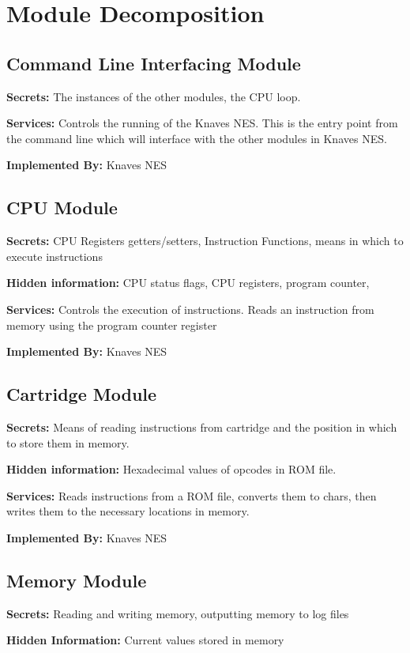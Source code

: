 \documentclass[12pt]{article}
\begin{document}
\section{Module Decomposition}
	\subsection{Command Line Interfacing Module}
		\textbf{Secrets: } The instances of the other modules, the CPU loop.

		\textbf{Services: } Controls the running of the Knaves NES. This is the entry point from the command line which will interface with the other modules in Knaves NES.

		\textbf{Implemented By: } Knaves NES

	\subsection{CPU Module}
		\textbf{Secrets: } CPU Registers getters/setters, Instruction Functions, means in which to execute instructions
		
		\textbf{Hidden information: } CPU status flags, CPU registers, program counter, 
		
		\textbf{Services: } Controls the execution of instructions. Reads an instruction from memory using the program counter register

		\textbf{Implemented By: } Knaves NES

	\subsection{Cartridge Module}
		\textbf{Secrets: } Means of reading instructions from cartridge and the position in which to store them in memory.

		\textbf{Hidden information: } Hexadecimal values of opcodes in ROM file.

		\textbf{Services: } Reads instructions from a ROM file, converts them to chars, then writes them to the necessary locations in memory.

		\textbf{Implemented By: } Knaves NES

	\subsection{Memory Module}
		\textbf{Secrets: } Reading and writing memory, outputting memory to log files

		\textbf{Hidden Information: } Current values stored in memory
\end{document}
